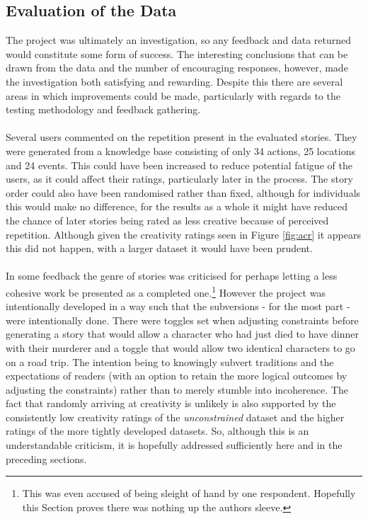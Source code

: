 \documentclass[letterpaper]{article}
\begin{document}
\subsection{Evaluation of the Data}
The project was ultimately an investigation, so any feedback and data returned would constitute some form of success. The interesting conclusions that can be drawn from the data and the number of encouraging responses, however, made the investigation both satisfying and rewarding. Despite this there are several areas in which improvements could be made, particularly with regards to the testing methodology and feedback gathering.\\
\\Several users commented on the repetition present in the evaluated stories. They were generated from a knowledge base consisting of only 34 actions, 25 locations and 24 events. This could have been increased to reduce potential fatigue of the users, as it could affect their ratings, particularly later in the process. The story order could also have been randomised rather than fixed, although for individuals this would make no difference, for the results as a whole it might have reduced the chance of later stories being rated as less creative because of perceived repetition. Although given the creativity ratings seen in Figure \ref{fig:acr} it appears this did not happen, with a larger dataset it would have been prudent.\\
\\In some feedback the genre of stories was criticised for perhaps letting a less cohesive work be presented as a completed one.\footnote{This was even accused of being sleight of hand by one respondent. Hopefully this Section proves there was nothing up the authors sleeve.} However the project was intentionally developed in a way such that the subversions - for the most part - were intentionally done. There were toggles set when adjusting constraints before generating a story that would allow a character who had just died to have dinner with their murderer and a toggle that would allow two identical characters to go on a road trip. The intention being to knowingly subvert traditions and the expectations of readers (with an option to retain the more logical outcomes by adjusting the constraints) rather than to merely stumble into incoherence. The fact that randomly arriving at creativity is unlikely is also supported by the consistently low creativity ratings of the \emph{unconstrained} dataset and the higher ratings of the more tightly developed datasets. So, although this is an understandable criticism, it is hopefully addressed sufficiently here and in the preceding sections.\\
\end{document}
